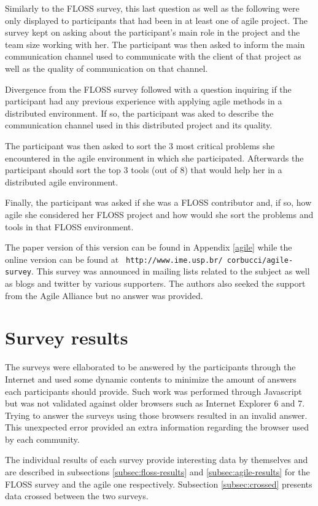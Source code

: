 \documentclass[lnbip]{svmultln}
\begin{document}
Similarly to the FLOSS survey, this last question as well as the
following were only displayed to participants that had been in at
least one of agile project. The survey kept on asking about the
participant's main role in the project and the team size working with
her. The participant was then asked to inform the main communication
channel used to communicate with the client of that project as well as
the quality of communication on that channel.

Divergence from the FLOSS survey followed with a question inquiring if
the participant had any previous experience with applying agile
methods in a distributed environment. If so, the participant was aked
to describe the communication channel used in this distributed project
and its quality.

The participant was then asked to sort the 3 most critical problems
she encountered in the agile environment in which she
participated. Afterwards the participant should sort the top 3 tools
(out of 8) that would help her in a distributed agile environment.

Finally, the participant was asked if she was a FLOSS contributor and,
if so, how agile she considered her FLOSS project and how would she
sort the problems and tools in that FLOSS environment.

The paper version of this version can be found in Appendix \ref{agile}
while the online version can be found at {\tt
  http://www.ime.usp.br/~corbucci/agile-survey}. This survey was
announced in mailing lists related to the subject as well as blogs and
twitter by various supporters. The authors also seeked the support
from the Agile Alliance but no answer was provided.

\section{Survey results}
\label{sec:results}

The surveys were ellaborated to be answered by the participants
through the Internet and used some dynamic contents to minimize the
amount of answers each participants should provide. Such work was
performed through Javascript but was not validated against older
browsers such as Internet Explorer 6 and 7. Trying to answer the
surveys using those browsers resulted in an invalid answer. This
unexpected error provided an extra information regarding the browser
used by each community.

The individual results of each survey provide interesting data by
themselves and are described in subsections \ref{subsec:floss-results}
and \ref{subsec:agile-results} for the FLOSS survey and the agile one
respectively. Subsection \ref{subsec:crossed} presents data crossed
between the two surveys.
\end{document}
